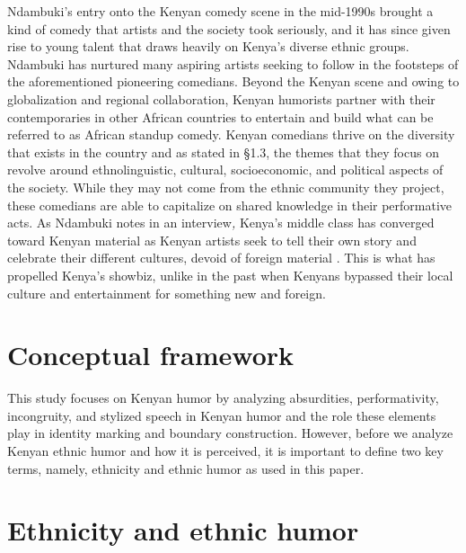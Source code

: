 \documentclass[output=paper]{langsci/langscibook}
\begin{document}
   Ndambuki’s entry onto the Kenyan comedy scene in the mid-1990s brought a kind of comedy that artists and the society took seriously, and it has since given rise to young talent that draws heavily on Kenya’s diverse ethnic groups. Ndambuki has nurtured many aspiring artists seeking to follow in the footsteps of the aforementioned pioneering comedians. Beyond the Kenyan scene and owing to globalization and regional collaboration, Kenyan humorists partner with their contemporaries in other African countries to entertain and build what can be referred to as African standup comedy. Kenyan comedians thrive on the diversity that exists in the country and as stated in §1.3, the themes that they focus on revolve around ethnolinguistic, cultural, socioeconomic, and political aspects of the society. While they may not come from the ethnic community they project, these comedians are able to capitalize on shared knowledge in their performative acts. As Ndambuki notes in an interview\textit{, }Kenya’s middle class has converged toward Kenyan material as Kenyan artists seek to tell their own story and celebrate their different cultures, devoid of foreign material \citep{Kimani2014}. This is what has propelled Kenya’s showbiz, unlike in the past when Kenyans bypassed their local culture and entertainment for something new and foreign. 

\section{ Conceptual framework}

   This study focuses on Kenyan humor by analyzing absurdities, performativity, incongruity, and stylized speech in Kenyan humor and the role these elements play in identity marking and boundary construction. However, before we analyze Kenyan ethnic humor and how it is perceived, it is important to define two key terms, namely, ethnicity and ethnic humor as used in this paper.

\section{Ethnicity and ethnic humor}
\end{document}
